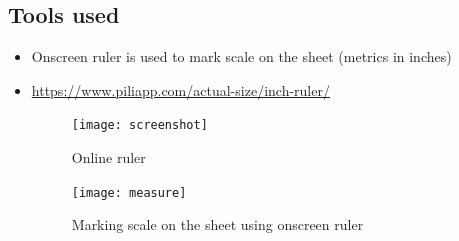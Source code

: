 \documentclass[11pt,a4paper]{article}
\begin{document}
				\subsection{Tools used}
				\begin{itemize}
					\item Onscreen ruler is used to mark scale on the sheet (metrics in inches)
					\item \url{https://www.piliapp.com/actual-size/inch-ruler/}
					\begin{figure}[H]
						\centering	
						\texttt{[image: screenshot]}
						\label{fig:sub1}
						\caption{Online ruler}
					\end{figure}
					
					\begin{figure}[H]
						\centering	
						\texttt{[image: measure]}
						\label{fig:sub1}
						\caption{Marking scale on the sheet using onscreen ruler}
					\end{figure}
					
				\end{itemize}
			
\end{document}
